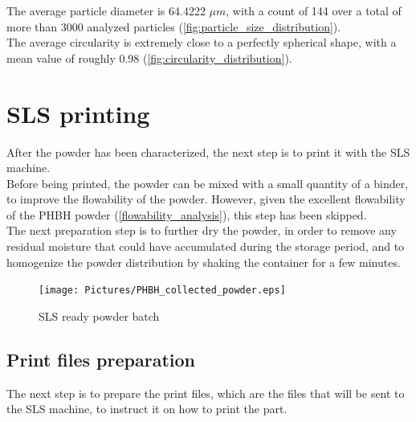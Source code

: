 \documentclass{article}
\begin{document}
    The average particle diameter is 64.4222 $\mu m$, with a count of 144 over a total of more 
    than 3000 analyzed particles (\ref{fig:particle_size_distribution}). \\ 

    The average circularity is extremely close to a perfectly spherical shape, with a 
    mean value of roughly 0.98 (\ref{fig:circularity_distribution}). \\ 



    \clearpage
    \section{SLS printing\label{SLS_printing_experimental}}

    After the powder has been characterized, the next step is to print it with the SLS machine. \\

    Before being printed, the powder can be mixed with a small quantity of a binder, to improve the flowability of the powder. 
    However, given the excellent flowability of the PHBH powder (\ref{flowability_analysis}), this step has been skipped. \\

    The next preparation step is to further dry the powder, in order to remove any residual moisture
    that could have accumulated during the storage period, and to homogenize the powder distribution 
    by shaking the container for a few minutes. \\

                \begin{figure}[h!]
                    \centering
                    \texttt{[image: Pictures/PHBH\_collected\_powder.eps]}
                    \caption{SLS ready powder batch}
                    \label{fig:PHBH_collected_powder}
                    
                \end{figure}

        \subsection{Print files preparation\label{Print_files_preparation}}

        The next step is to prepare the print files, which are the files that will be sent to the SLS machine, 
        to instruct it on how to print the part. \\
\end{document}
